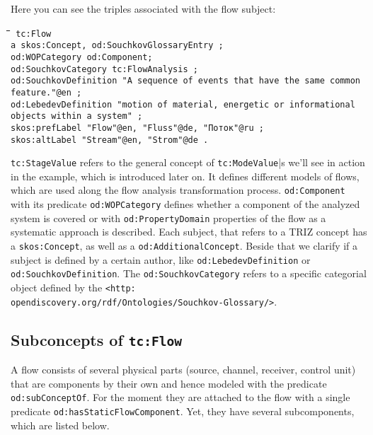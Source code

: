 \documentclass[a4paper,11pt]{article}
\newenvironment{code}{\tt \begin{tabbing}
\hskip12pt\=\hskip12pt\=\hskip12pt\=\hskip12pt\=\hskip5cm\=\hskip5cm\=\kill}
{\end{tabbing}}
\begin{document}
\begin{itemize}
    Here you can see the triples associated with the flow subject:
    \begin{code}\tt
    tc:Flow \\
    \> a skos:Concept, od:SouchkovGlossaryEntry ; \\
    \> od:WOPCategory od:Component; \\
    \> od:SouchkovCategory tc:FlowAnalysis ; \\
    \> od:SouchkovDefinition "A sequence of events that have the same common \\
    \> feature."@en ; \\
    \> od:LebedevDefinition "motion of material, energetic or informational \\
    \> objects within a system" ; \\
    \> skos:prefLabel "Flow"@en, "Fluss"@de, "Поток"@ru ; \\
    \> skos:altLabel "Stream"@en, "Strom"@de . \\
    \end{code}

    \texttt{tc:StageValue} refers to the general concept of \texttt{tc:ModeValue}|s 
    we'll see in action in the example, which is introduced later on. It defines
    different models of flows, which are used along the flow analysis 
    transformation process. \texttt{od:Component} with its predicate
    \texttt{od:WOPCategory} defines whether a component of the analyzed system
    is covered or with \texttt{od:PropertyDomain} properties of the flow as a
    systematic approach is described. Each subject, that refers to a TRIZ 
    concept has a \texttt{skos:Concept}, as well as a 
    \texttt{od:AdditionalConcept}. Beside that we clarify if a subject is defined
    by a certain author, like \texttt{od:LebedevDefinition} or 
    \texttt{od:SouchkovDefinition}. The \texttt{od:SouchkovCategory} refers to a
    specific categorial object defined by the
    \texttt{<http:\\opendiscovery.org/rdf/Ontologies/Souchkov-Glossary/>}.

    \subsection{Subconcepts of \texttt{tc:Flow}}

    A flow consists of several physical parts (source, channel, receiver, 
    control unit) that are components by their own and hence modeled with the 
    predicate \texttt{od:subConceptOf}. For the moment they are attached to the
    flow with a single predicate \texttt{od:hasStaticFlowComponent}. Yet, they 
    have several subcomponents, which are listed below.


\end{itemize}
\end{document}

